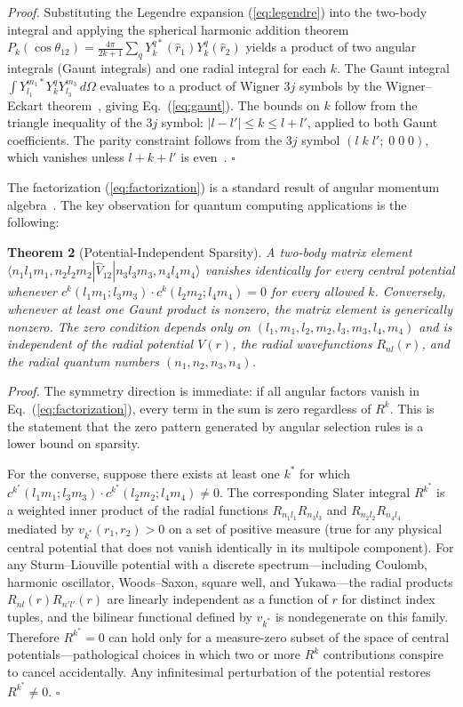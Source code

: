 \documentclass[twocolumn,pra,amsmath,amssymb,superscriptaddress]{revtex4-2}
\begin{document}
\textit{Proof.}  Substituting the Legendre expansion
(\ref{eq:legendre}) into the two-body integral and applying the
spherical harmonic addition theorem
$P_k(\cos\theta_{12}) = \frac{4\pi}{2k+1} \sum_q Y_k^{q*}(\hat{r}_1) Y_k^q(\hat{r}_2)$
yields a product of two angular integrals (Gaunt integrals) and one
radial integral for each $k$.  The Gaunt integral
$\int Y_{l_1}^{m_1*} Y_k^q Y_{l_3}^{m_3}\, d\Omega$ evaluates to
a product of Wigner 3$j$ symbols by the Wigner--Eckart
theorem~\cite{Messiah1962}, giving Eq.~(\ref{eq:gaunt}).  The bounds
on $k$ follow from the triangle inequality of the 3$j$ symbol:
$|l - l'| \leq k \leq l + l'$, applied to both Gaunt coefficients.
The parity constraint follows from the 3$j$ symbol
$(l\; k\; l';\; 0\; 0\; 0)$, which vanishes unless $l + k + l'$ is
even~\cite{CondonShortley1935}.  \hfill$\square$

The factorization (\ref{eq:factorization}) is a standard result of
angular momentum algebra~\cite{CondonShortley1935, Slater1960,
Messiah1962}.  The key observation for quantum computing applications
is the following:

\medskip
\noindent\textbf{Theorem 2} (Potential-Independent Sparsity).
\textit{A two-body matrix element
$\langle n_1 l_1 m_1, n_2 l_2 m_2 | \hat{V}_{12} | n_3 l_3 m_3, n_4 l_4 m_4 \rangle$
vanishes identically for every central potential whenever
$c^k(l_1 m_1; l_3 m_3) \cdot c^k(l_2 m_2; l_4 m_4) = 0$
for every allowed $k$.  Conversely, whenever at least one Gaunt
product is nonzero, the matrix element is generically nonzero.  The
zero condition depends only on
$(l_1, m_1, l_2, m_2, l_3, m_3, l_4, m_4)$ and is independent of the
radial potential $V(r)$, the radial wavefunctions $R_{nl}(r)$, and
the radial quantum numbers $(n_1, n_2, n_3, n_4)$.}

\textit{Proof.}  The symmetry direction is immediate: if all angular
factors vanish in Eq.~(\ref{eq:factorization}), every term in the sum
is zero regardless of $R^k$.  This is the statement that the zero
pattern generated by angular selection rules is a lower bound on
sparsity.

For the converse, suppose there exists at least one $k^*$ for which
$c^{k^*}(l_1 m_1; l_3 m_3) \cdot c^{k^*}(l_2 m_2; l_4 m_4) \neq 0$.
The corresponding Slater integral $R^{k^*}$ is a weighted inner
product of the radial functions $R_{n_1 l_1} R_{n_3 l_3}$ and
$R_{n_2 l_2} R_{n_4 l_4}$ mediated by $v_{k^*}(r_1, r_2) > 0$ on a
set of positive measure (true for any physical central potential that
does not vanish identically in its multipole component).  For any
Sturm--Liouville potential with a discrete spectrum---including
Coulomb, harmonic oscillator, Woods--Saxon, square well, and
Yukawa---the radial products $R_{n l}(r) R_{n' l'}(r)$ are linearly
independent as a function of $r$ for distinct index tuples, and the
bilinear functional defined by $v_{k^*}$ is nondegenerate on this
family.  Therefore $R^{k^*} = 0$ can hold only for a measure-zero
subset of the space of central potentials---pathological choices in
which two or more $R^k$ contributions conspire to cancel
accidentally.  Any infinitesimal perturbation of the potential
restores $R^{k^*} \neq 0$.  \hfill$\square$
\end{document}
